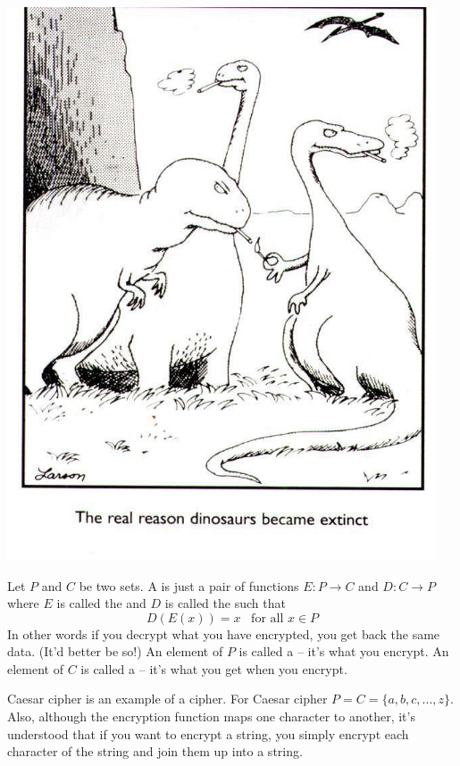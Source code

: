 \newpage
\begin{center}
\includegraphics[width=5in]{dino-plaintext.jpg}
\end{center}



Let $P$ and $C$ be two sets.
A
is just a pair of functions
$E: P \rightarrow C$ and $D: C \rightarrow P$
where $E$ is called the
and $D$ is called the
such that
\[
D(E(x)) = x \,\,\, \text{ for all } x \in P
\]
In other words
if you decrypt what you have encrypted, you get back the same data.
(It'd better be so!)
An element of $P$ is called a
 --
it's what you encrypt.
An element of $C$ is called a
--
it's what you get when you encrypt.

Caesar cipher is an example of a cipher.
For Caesar cipher $P = C = \{a, b, c, ..., z\}$.
Also, although the encryption function maps one character to another,
it's understood that if you want to encrypt a string, you
simply encrypt each character of the string and join them up into
a string.

